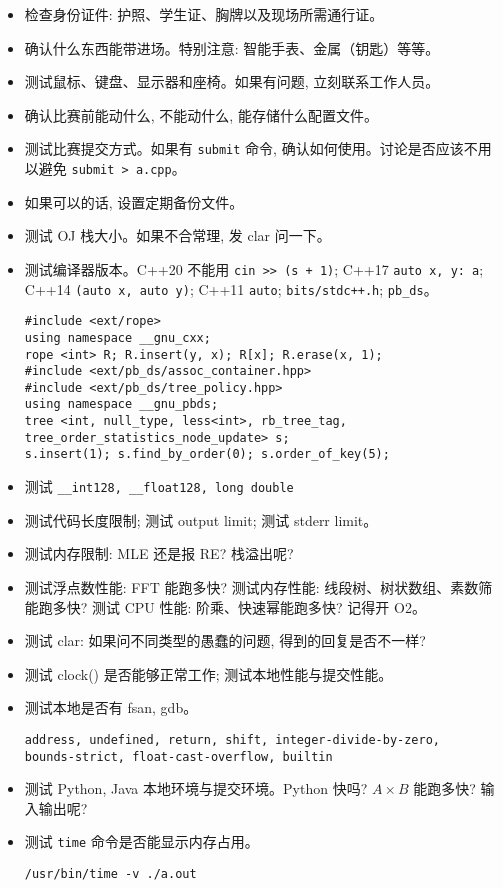 \begin{small}
\begin{itemize}[leftmargin=1mm]
    \setlength{\itemsep}{0pt}
    \setlength{\parskip}{0.5pt}
    \item 检查身份证件: 护照、学生证、胸牌以及现场所需通行证。
    \item 确认什么东西能带进场。特别注意: 智能手表、金属（钥匙）等等。
    \item 测试鼠标、键盘、显示器和座椅。如果有问题, 立刻联系工作人员。
    \item 确认比赛前能动什么, 不能动什么, 能存储什么配置文件。
    \item 测试比赛提交方式。如果有 \texttt{submit} 命令, 确认如何使用。讨论是否应该不用以避免 \texttt{submit > a.cpp}。
    \item 如果可以的话, 设置定期备份文件。
    \item 测试 OJ 栈大小。如果不合常理, 发 clar 问一下。
    \item 测试编译器版本。C++20 不能用 \texttt{cin >> (s + 1)}; C++17 \texttt{auto \lbrack x, y\rbrack : a}; C++14 \texttt{\lbrack \rbrack (auto x, auto y)}; C++11 \texttt{auto}; \texttt{bits/stdc++.h}; \texttt{pb\_ds}。
\begin{verbatim}
#include <ext/rope>
using namespace __gnu_cxx;
rope <int> R; R.insert(y, x); R[x]; R.erase(x, 1);
#include <ext/pb_ds/assoc_container.hpp> 
#include <ext/pb_ds/tree_policy.hpp> 
using namespace __gnu_pbds;
tree <int, null_type, less<int>, rb_tree_tag,
tree_order_statistics_node_update> s;
s.insert(1); s.find_by_order(0); s.order_of_key(5);
\end{verbatim}
    \item 测试 \texttt{\_\_int128, \_\_float128, long double}
    \item 测试代码长度限制; 测试 output limit; 测试 stderr limit。
    \item 测试内存限制: MLE 还是报 RE? 栈溢出呢? 
    \item 测试浮点数性能: FFT 能跑多快? 测试内存性能: 线段树、树状数组、素数筛能跑多快? 测试 CPU 性能: 阶乘、快速幂能跑多快? 记得开 O2。
    \item 测试 clar: 如果问不同类型的愚蠢的问题, 得到的回复是否不一样? 
    \item 测试 clock() 是否能够正常工作; 测试本地性能与提交性能。
    \item 测试本地是否有 fsan, gdb。\begin{verbatim}
address, undefined, return, shift, integer-divide-by-zero,
bounds-strict, float-cast-overflow, builtin
\end{verbatim}
    \item 测试 Python, Java 本地环境与提交环境。Python 快吗? $A\times B$ 能跑多快? 输入输出呢? 
    \item 测试 \texttt{time} 命令是否能显示内存占用。
\begin{verbatim}
/usr/bin/time -v ./a.out
\end{verbatim}
\end{itemize}
\end{small}
